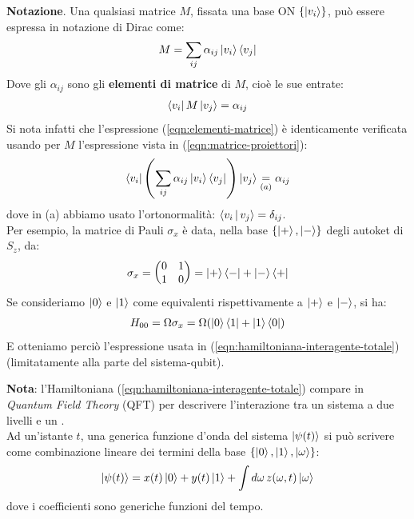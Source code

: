\documentclass[../../InformazioneQuantistica.tex]{subfiles}
\begin{document}
\begin{expl}
\textbf{Notazione}. Una qualsiasi matrice $M$, fissata una base ON $\{\Ket{v_i}\}$, può essere espressa in notazione di Dirac come:
\begin{align}
M = \sum_{ij} \alpha_{ij} \Ket{v_i}\Bra{v_j}
\label{eqn:matrice-proiettori}
\end{align}
Dove gli $\alpha_{ij}$ sono gli \textbf{elementi di matrice} di $M$, cioè le sue entrate:
\begin{align}
\Bra{v_i}M\Ket{v_j} = \alpha_{ij}
\label{eqn:elementi-matrice}
\end{align}
Si nota infatti che l'espressione (\ref{eqn:elementi-matrice}) è identicamente verificata usando per $M$ l'espressione vista in (\ref{eqn:matrice-proiettori}):
\begin{align*}
\Bra{v_i}\left(\sum_{ij}\alpha_{ij}\Ket{v_i}\Bra{v_j}\right)\Ket{v_j} \underset{(a)}{=} \alpha_{ij}
\end{align*}
dove in (a) abbiamo usato l'ortonormalità: $\Braket{v_i|v_j} = \delta_{ij}$.\\
Per esempio, la matrice di Pauli $\sigma_x$ è data, nella base $\{\Ket{+}, \Ket{-}\}$ degli autoket di $S_z$, da:
\begin{align*}
\sigma_x = \begin{pmatrix}0 & 1\\1 & 0
\end{pmatrix} = \Ket{+}\Bra{-} + \Ket{-}\Bra{+}
\end{align*}
Se consideriamo $\Ket{0}$ e $\Ket{1}$ come equivalenti rispettivamente a $\Ket{+}$ e $\Ket{-}$, si ha:
\begin{align*}
H_{00} = \Omega \sigma_x = \Omega(\Ket{0}\Bra{1}+\Ket{1}\Bra{0})
\end{align*}
E otteniamo perciò l'espressione usata in (\ref{eqn:hamiltoniana-interagente-totale}) (limitatamente alla parte del sistema-qubit).
\end{expl}
 
\textbf{Nota}: l'Hamiltoniana (\ref{eqn:hamiltoniana-interagente-totale}) compare in \textit{Quantum Field Theory} (QFT) per descrivere l'interazione tra un sistema a due livelli e un .\\


Ad un'istante $t$, una generica funzione d'onda del sistema $\Ket{\psi(t)}$ si può scrivere come combinazione lineare dei termini della base $\{\Ket{0}, \Ket{1}, \Ket{\omega}\}$:
\begin{align*}
\Ket{\psi(t)} = x(t)\Ket{0} + y(t)\Ket{1} + \int d\omega\, z(\omega, t)\Ket{\omega}
\end{align*}
dove i coefficienti sono generiche funzioni del tempo.\\
\end{document}

